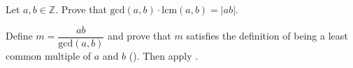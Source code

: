 \begin{exercise}
\label{exProductOfIntegersIsProductOfGCDAndLCM}
Let $a,b \in \mathbb{Z}$. Prove that $\mathrm{gcd}(a,b) \cdot \mathrm{lcm}(a,b) = |ab|$.
\begin{backhint}
Define $m = \dfrac{ab}{\mathrm{gcd}(a,b)}$ and prove that $m$ satisfies the definition of being a least common multiple of $a$ and $b$ (). Then apply .
\end{backhint}
\end{exercise}